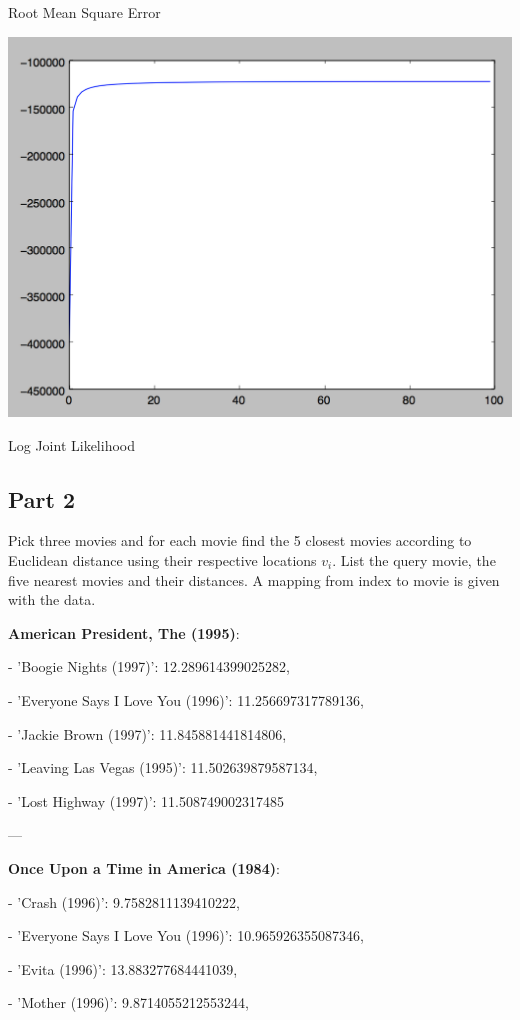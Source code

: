 \documentclass[11pt]{article}
\begin{document}
Root Mean Square Error

\includegraphics[scale=.6]{images/ljl}

Log Joint Likelihood

\subsection*{Part 2}

Pick three movies and for each movie find the 5 closest movies according to Euclidean distance using their respective locations $v_i$. List the query movie, the five nearest movies and their distances. A mapping from index to movie is given with the data.

\textbf{American President, The (1995)}:

- 'Boogie Nights (1997)': 12.289614399025282,

 - 'Everyone Says I Love You (1996)': 11.256697317789136,

 - 'Jackie Brown (1997)': 11.845881441814806,

 - 'Leaving Las Vegas (1995)': 11.502639879587134,

 - 'Lost Highway (1997)': 11.508749002317485
 
 ---
 
\textbf{Once Upon a Time in America (1984)}:

- 'Crash (1996)': 9.7582811139410222,

- 'Everyone Says I Love You (1996)': 10.965926355087346,

- 'Evita (1996)': 13.883277684441039,

- 'Mother (1996)': 9.8714055212553244,
\end{document}
